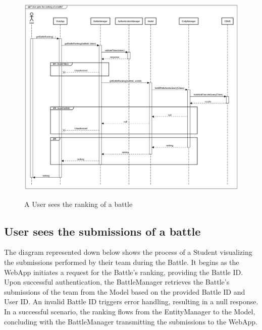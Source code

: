 \documentclass{Configuration_Files/Template}
\begin{document}
\begin{figure}[H]
\centering
\includegraphics[scale = 0.33]{Images/diagrams/sequences/GetBattleRanking.png}\\
\caption{A User sees the ranking of a battle}
\end{figure}

\subsection*{User sees the submissions of a battle}

The diagram represented down below shows the process of a Student visualizing the submissions performed by their team during the Battle. It begins as the WebApp initiates a request for the Battle's ranking, providing the Battle ID. Upon successful authentication, the BattleManager retrieves the Battle's submissions of the team from the Model based on the provided Battle ID and User ID. An invalid Battle ID triggers error handling, resulting in a null response. In a successful scenario, the ranking flows from the EntityManager to the Model, concluding with the BattleManager transmitting the submissions to the WebApp.
\end{document}
